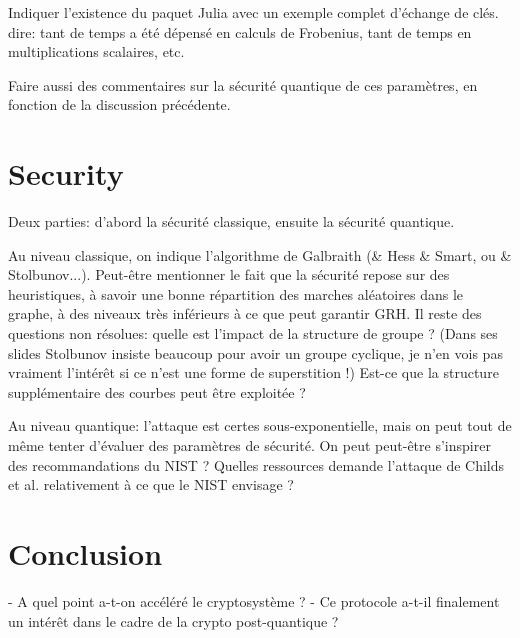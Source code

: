 \documentclass{article}
\theoremstyle{definition}
\begin{document}
Indiquer l'existence du paquet Julia avec un exemple complet d'échange
de clés. dire: tant de temps a été dépensé en
calculs de Frobenius, tant de temps en multiplications scalaires, etc.

Faire aussi des commentaires sur la sécurité quantique de ces
paramètres, en fonction de la discussion précédente. 

\section{Security}

Deux parties: d'abord la sécurité classique, ensuite la sécurité quantique.

Au niveau classique, on indique l'algorithme de Galbraith (\& Hess \&
Smart, ou \& Stolbunov...). Peut-être mentionner le fait que la
sécurité repose sur des heuristiques, à savoir une bonne répartition
des marches aléatoires dans le graphe, à des niveaux très inférieurs à
ce que peut garantir GRH.  Il reste des questions non résolues: quelle
est l'impact de la structure de groupe ? (Dans ses slides Stolbunov
insiste beaucoup pour avoir un groupe cyclique, je n'en vois pas
vraiment l'intérêt si ce n'est une forme de superstition !)  Est-ce
que la structure supplémentaire des courbes peut être exploitée ?

Au niveau quantique: l'attaque est certes sous-exponentielle, mais on
peut tout de même tenter d'évaluer des paramètres de sécurité. On peut
peut-être s'inspirer des recommandations du NIST ? Quelles ressources
demande l'attaque de Childs et al. relativement à ce que le NIST
envisage ?


\section{Conclusion}

- A quel point a-t-on accéléré le cryptosystème ?
- Ce protocole a-t-il finalement un intérêt dans le cadre de la crypto post-quantique ?




\end{document}
